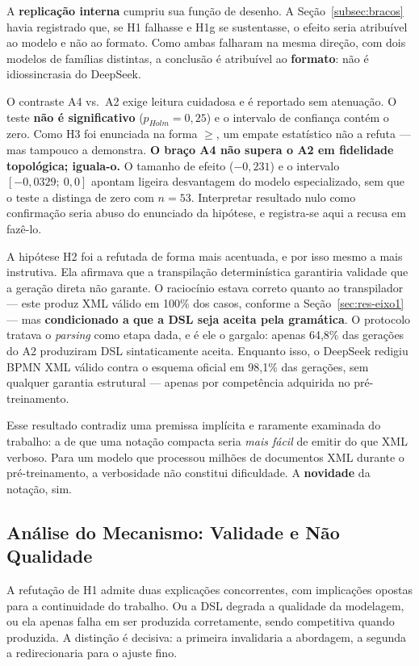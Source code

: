 A \textbf{replicação interna} cumpriu sua função de desenho. A Seção~\ref{subsec:bracos} havia registrado que, se H1 falhasse e H1g se sustentasse, o efeito seria atribuível ao modelo e não ao formato. Como ambas falharam na mesma direção, com dois modelos de famílias distintas, a conclusão é atribuível ao \textbf{formato}: não é idiossincrasia do DeepSeek.

O contraste A4 vs.\ A2 exige leitura cuidadosa e é reportado sem atenuação. O teste \textbf{não é significativo} ($p_{Holm} = 0{,}25$) e o intervalo de confiança contém o zero. Como H3 foi enunciada na forma $\geq$, um empate estatístico não a refuta --- mas tampouco a demonstra. \textbf{O braço A4 não supera o A2 em fidelidade topológica; iguala-o.} O tamanho de efeito ($-0{,}231$) e o intervalo $[-0{,}0329;\ 0{,}0]$ apontam ligeira desvantagem do modelo especializado, sem que o teste a distinga de zero com $n = 53$. Interpretar resultado nulo como confirmação seria abuso do enunciado da hipótese, e registra-se aqui a recusa em fazê-lo.

A hipótese H2 foi a refutada de forma mais acentuada, e por isso mesmo a mais instrutiva. Ela afirmava que a transpilação determinística garantiria validade que a geração direta não garante. O raciocínio estava correto quanto ao transpilador — este produz XML válido em 100\% dos casos, conforme a Seção~\ref{sec:res-eixo1} — mas \textbf{condicionado a que a DSL seja aceita pela gramática}. O protocolo tratava o \textit{parsing} como etapa dada, e é ele o gargalo: apenas 64,8\% das gerações do A2 produziram DSL sintaticamente aceita. Enquanto isso, o DeepSeek redigiu BPMN XML válido contra o esquema oficial em 98,1\% das gerações, sem qualquer garantia estrutural — apenas por competência adquirida no pré-treinamento.

Esse resultado contradiz uma premissa implícita e raramente examinada do trabalho: a de que uma notação compacta seria \textit{mais fácil} de emitir do que XML verboso. Para um modelo que processou milhões de documentos XML durante o pré-treinamento, a verbosidade não constitui dificuldade. A \textbf{novidade} da notação, sim.

\subsection{Análise do Mecanismo: Validade e Não Qualidade}
\label{subsec:res-mecanismo}

A refutação de H1 admite duas explicações concorrentes, com implicações opostas para a continuidade do trabalho. Ou a DSL degrada a qualidade da modelagem, ou ela apenas falha em ser produzida corretamente, sendo competitiva quando produzida. A distinção é decisiva: a primeira invalidaria a abordagem, a segunda a redirecionaria para o ajuste fino.

